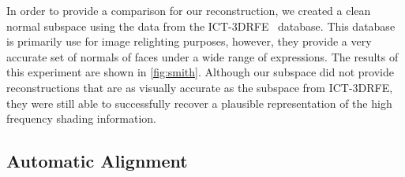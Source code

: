 In order to provide a comparison for our reconstruction, we created a clean
normal subspace using the data from the ICT-3DRFE~\cite{Stratou:2012jh}
database. This database is primarily use for image relighting purposes, however,
they provide a very accurate set of normals of faces under a wide range of
expressions. The results of this experiment are shown in \cref{fig:smith}.
Although our subspace did not provide reconstructions that are as visually
accurate as the subspace from ICT-3DRFE, they were still able to successfully
recover a plausible representation of the high frequency shading information.
\subsection{Automatic Alignment}\label{subsec:experiments_alignment}
\newcommand{\tomhanksalignment}[1]
{
\texttt{[image: images/tom\_hanks/tom\_hanks\_improve\_\#1\_initial]} &
\texttt{[image: images/tom\_hanks/tom\_hanks\_improve\_\#1\_final]}   & \hspace{0.3cm}
\texttt{[image: images/tom\_hanks/tom\_hanks\_improve\_\#1\_depth]}
}
